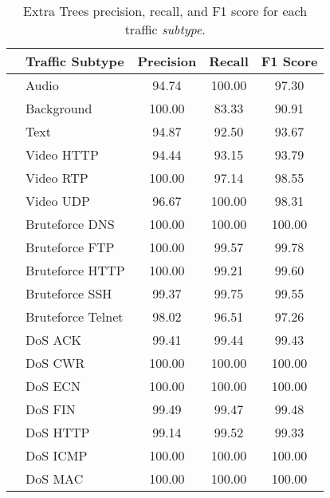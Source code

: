 \documentclass[lettersize,journal]{IEEEtran}
\begin{document}
\begin{table}[t]
    \centering
    \caption{Extra Trees precision, recall, and F1 score for each traffic \textit{subtype}.}
    \begin{tabularx}{\columnwidth}{l l CCC} 
        \toprule
        {} & \textbf{Traffic Subtype }& \textbf{Precision}  &       \textbf{Recall}  &   \textbf{F1 Score} \\
        \midrule
         & Audio & 94.74 &  100.00 &     97.30 \\
        {} & Background              &     100.00 &   83.33 &     90.91 \\
        {} & Text                    &      94.87 &   92.50 &     93.67 \\
        {} & Video HTTP              &      94.44 &   93.15 &     93.79 \\
        {} & Video RTP               &     100.00 &   97.14 &     98.55 \\
        {} & Video UDP               &      96.67 &  100.00 &     98.31 \\
        \midrule
         & Bruteforce \ac{DNS}          &     100.00 &  100.00 &    100.00 \\ 
        {} & Bruteforce FTP          &     100.00 &   99.57 &     99.78 \\
        {} & Bruteforce HTTP         &     100.00 &   99.21 &     99.60 \\
        {} & Bruteforce SSH          &      99.37 &   99.75 &     99.55 \\
        {} & Bruteforce Telnet       &      98.02 &   96.51 &     97.26 \\
        {} & DoS ACK                 &      99.41 &   99.44 &     99.43 \\
        {} & DoS CWR                 &     100.00 &  100.00 &    100.00 \\
        {} & DoS ECN                 &     100.00 &  100.00 &    100.00 \\
        {} & DoS FIN                 &      99.49 &   99.47 &     99.48 \\
        {} & DoS HTTP                &      99.14 &   99.52 &     99.33 \\
        {} & DoS \ac{ICMP}                &     100.00 &  100.00 &    100.00 \\
        {} & DoS MAC                 &     100.00 &  100.00 &    100.00 \\

\end{tabularx}
\end{table}
\end{document}
